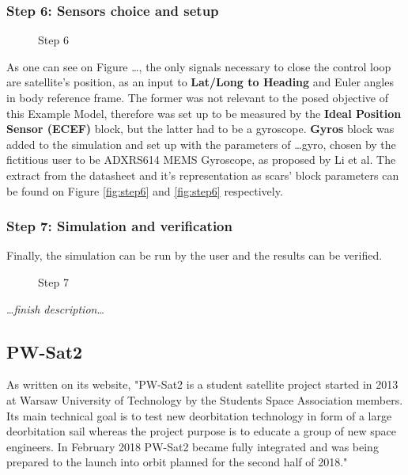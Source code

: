         \subsubsection*{Step 6: Sensors choice and setup}
            \begin{figure}[H]
                \centering
                \qquad
                \caption{Step 6}%
                \label{fig:step6}%
            \end{figure}
            As one can see on Figure \dots, the only signals necessary to close the control loop are satellite's position, as an input to \textbf{Lat/Long to Heading} and Euler angles in body reference frame. The former was not relevant to the posed objective of this Example Model, therefore was set up to be measured by the \textbf{Ideal Position Sensor (ECEF)} block, but the latter had to be a gyroscope. \textbf{Gyros} block was added to the simulation and set up with the parameters of \dots gyro, chosen by the fictitious user to be ADXRS614 MEMS Gyroscope, as proposed by Li et al.\cite{li2013design} The extract from the datasheet and it's representation as \ac{scars}' block parameters can be found on Figure \autoref{fig:step6}  and \autoref{fig:step6}  respectively.

        \subsubsection*{Step 7: Simulation and verification}
            Finally, the simulation can be run by the user and the results can be verified.         
            \begin{figure}[H]
                \centering
                \caption{Step 7}%
                \label{fig:step6}%
            \end{figure}
 
            \dots\textit{finish description}\dots

    \subsection{PW-Sat2}
        As written on its website, "PW-Sat2 is a student satellite project started in 2013 at Warsaw University of Technology by the Students Space Association members. Its main technical goal is to test new deorbitation technology in form of a large deorbitation sail whereas the project purpose is to educate a group of new space engineers. In February 2018 PW-Sat2 became fully integrated and was being prepared to the launch into orbit planned for the second half of 2018."\cite{pwsat2website}
        
